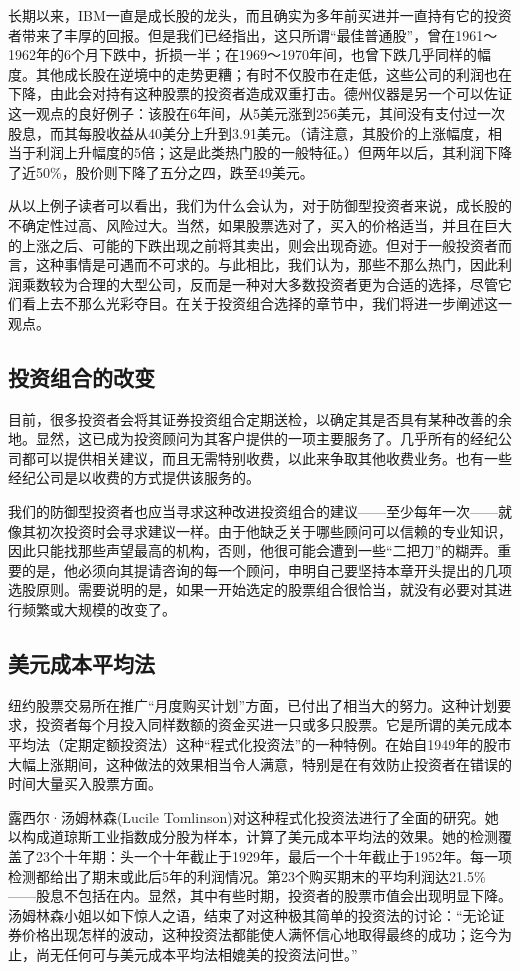 \documentclass[12pt,oneside]{book}
\begin{document}
长期以来，IBM一直是成长股的龙头，而且确实为多年前买进并一直持有它的投资者带来了丰厚的回报。但是我们已经指出，这只所谓“最佳普通股”，曾在1961～1962年的6个月下跌中，折损一半；在1969～1970年间，也曾下跌几乎同样的幅度。其他成长股在逆境中的走势更糟；有时不仅股市在走低，这些公司的利润也在下降，由此会对持有这种股票的投资者造成双重打击。德州仪器是另一个可以佐证这一观点的良好例子：该股在6年间，从5美元涨到256美元，其间没有支付过一次股息，而其每股收益从40美分上升到3.91美元。（请注意，其股价的上涨幅度，相当于利润上升幅度的5倍；这是此类热门股的一般特征。）但两年以后，其利润下降了近50\%，股价则下降了五分之四，跌至49美元。

从以上例子读者可以看出，我们为什么会认为，对于防御型投资者来说，成长股的不确定性过高、风险过大。当然，如果股票选对了，买入的价格适当，并且在巨大的上涨之后、可能的下跌出现之前将其卖出，则会出现奇迹。但对于一般投资者而言，这种事情是可遇而不可求的。与此相比，我们认为，那些不那么热门，因此利润乘数较为合理的大型公司，反而是一种对大多数投资者更为合适的选择，尽管它们看上去不那么光彩夺目。在关于投资组合选择的章节中，我们将进一步阐述这一观点。

\subsection{投资组合的改变}
目前，很多投资者会将其证券投资组合定期送检，以确定其是否具有某种改善的余地。显然，这已成为投资顾问为其客户提供的一项主要服务了。几乎所有的经纪公司都可以提供相关建议，而且无需特别收费，以此来争取其他收费业务。也有一些经纪公司是以收费的方式提供该服务的。

我们的防御型投资者也应当寻求这种改进投资组合的建议——至少每年一次——就像其初次投资时会寻求建议一样。由于他缺乏关于哪些顾问可以信赖的专业知识，因此只能找那些声望最高的机构，否则，他很可能会遭到一些“二把刀”的糊弄。重要的是，他必须向其提请咨询的每一个顾问，申明自己要坚持本章开头提出的几项选股原则。需要说明的是，如果一开始选定的股票组合很恰当，就没有必要对其进行频繁或大规模的改变了。

\subsection{美元成本平均法}
纽约股票交易所在推广“月度购买计划”方面，已付出了相当大的努力。这种计划要求，投资者每个月投入同样数额的资金买进一只或多只股票。它是所谓的美元成本平均法（定期定额投资法）这种“程式化投资法”的一种特例。在始自1949年的股市大幅上涨期间，这种做法的效果相当令人满意，特别是在有效防止投资者在错误的时间大量买入股票方面。

露西尔·汤姆林森(Lucile Tomlinson)对这种程式化投资法进行了全面的研究。她以构成道琼斯工业指数成分股为样本，计算了美元成本平均法的效果。她的检测覆盖了23个十年期：头一个十年截止于1929年，最后一个十年截止于1952年。每一项检测都给出了期末或此后5年的利润情况。第23个购买期末的平均利润达21.5\%——股息不包括在内。显然，其中有些时期，投资者的股票市值会出现明显下降。汤姆林森小姐以如下惊人之语，结束了对这种极其简单的投资法的讨论：“无论证券价格出现怎样的波动，这种投资法都能使人满怀信心地取得最终的成功；迄今为止，尚无任何可与美元成本平均法相媲美的投资法问世。”
\end{document}
